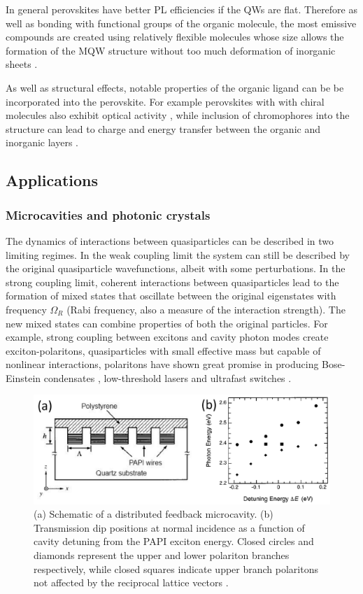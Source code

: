 In general perovskites have better PL efficiencies if the QWs are flat. Therefore as well as bonding with functional groups of the organic molecule, the most emissive compounds are created using relatively flexible molecules whose size allows the formation of the MQW structure without too much deformation of inorganic sheets \cite{Zhang2009}.

As well as structural effects, notable properties of the organic ligand can be be incorporated into the perovskite. For example perovskites with with chiral molecules also exhibit optical activity \cite{Teshima2003}, while inclusion of chromophores into the structure can lead to charge and energy transfer between the organic and inorganic layers \cite{Kawabata2009, Mitzi1999a, Braun1999}.

\subsection{Applications}
\subsubsection{Microcavities and photonic crystals}
The dynamics of interactions between quasiparticles can be described in two limiting regimes. In the weak coupling limit the system can still be described by the original quasiparticle wavefunctions, albeit with some perturbations. In the strong coupling limit, coherent interactions between quasiparticles lead to the formation of mixed states that oscillate between the original eigenstates with frequency $\Omega_R$ (Rabi frequency, also a measure of the interaction strength). The new mixed states can combine properties of both the original particles. For example, strong coupling between excitons and cavity photon modes create exciton-polaritons, quasiparticles with small effective mass but capable of nonlinear interactions, polaritons have shown great promise in producing Bose-Einstein condensates \cite{Kasprzak2006}, low-threshold lasers \cite{Christopoulos2007} and ultrafast switches \cite{Amo2010}.
\begin{figure}[h!]
\centering
\includegraphics[width=\textwidth]{Fig20}
\caption{(a) Schematic of a distributed feedback microcavity. (b) Transmission dip positions at normal incidence as a function of cavity detuning from the PAPI exciton energy. Closed circles and diamonds represent the upper and lower polariton branches respectively, while closed squares indicate upper branch polaritons not affected by the reciprocal lattice vectors \cite{Fujita1998}.}
\label{2Fig20}
\end{figure}

